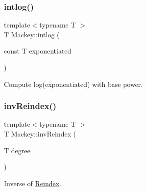 \subsubsection{\texorpdfstring{intlog()}{intlog()}}
{\footnotesize\ttfamily template$<$typename T $>$ \\
T Mackey\+::intlog (\begin{DoxyParamCaption}\item[{const T}]{exponentiated }\end{DoxyParamCaption})\hspace{0.3cm}{\ttfamily [inline]}}



Compute log(exponentiated) with base power. 

\mbox{\label{namespaceMackey_a5efb3695c450e4e590b86f20700f726b}} 
\subsubsection{\texorpdfstring{inv\+Reindex()}{invReindex()}\hspace{0.1cm}{\footnotesize\ttfamily [1/2]}}
{\footnotesize\ttfamily template$<$typename T $>$ \\
T Mackey\+::inv\+Reindex (\begin{DoxyParamCaption}\item[{T}]{degree }\end{DoxyParamCaption})\hspace{0.3cm}{\ttfamily [inline]}}



Inverse of \hyperlink{namespaceMackey_a7da73ade3ee83c4ffd614e79242d7c04}{Reindex}. 

